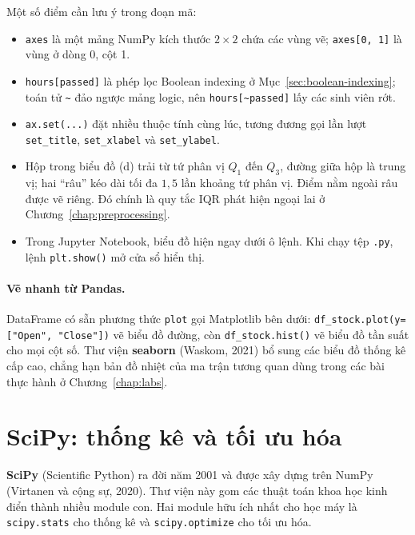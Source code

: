Một số điểm cần lưu ý trong đoạn mã:
\begin{itemize}
    \item \texttt{axes} là một mảng NumPy kích thước $2 \times 2$ chứa các vùng vẽ; \texttt{axes[0, 1]} là vùng ở dòng 0, cột 1.
    \item \texttt{hours[passed]} là phép lọc Boolean indexing ở Mục~\ref{sec:boolean-indexing}; toán tử \texttt{\textasciitilde} đảo ngược mảng logic, nên \texttt{hours[\textasciitilde passed]} lấy các sinh viên rớt.
    \item \texttt{ax.set(...)} đặt nhiều thuộc tính cùng lúc, tương đương gọi lần lượt \texttt{set\_title}, \texttt{set\_xlabel} và \texttt{set\_ylabel}.
    \item Hộp trong biểu đồ (d) trải từ tứ phân vị $Q_1$ đến $Q_3$, đường giữa hộp là trung vị; hai ``râu'' kéo dài tối đa $1{,}5$ lần khoảng tứ phân vị. Điểm nằm ngoài râu được vẽ riêng. Đó chính là quy tắc IQR phát hiện ngoại lai ở Chương~\ref{chap:preprocessing}.
    \item Trong Jupyter Notebook, biểu đồ hiện ngay dưới ô lệnh. Khi chạy tệp \texttt{.py}, lệnh \texttt{plt.show()} mở cửa sổ hiển thị.
\end{itemize}

\paragraph{Vẽ nhanh từ Pandas.} DataFrame có sẵn phương thức \texttt{plot} gọi Matplotlib bên dưới: \texttt{df\_stock.plot(y=["Open", "Close"])} vẽ biểu đồ đường, còn \texttt{df\_stock.hist()} vẽ biểu đồ tần suất cho mọi cột số. Thư viện \textbf{seaborn} (Waskom, 2021) bổ sung các biểu đồ thống kê cấp cao, chẳng hạn bản đồ nhiệt của ma trận tương quan dùng trong các bài thực hành ở Chương~\ref{chap:labs}.

\section{SciPy: thống kê và tối ưu hóa}
\label{sec:scipy}

\textbf{SciPy} (Scientific Python) ra đời năm 2001 và được xây dựng trên NumPy (Virtanen và cộng sự, 2020). Thư viện này gom các thuật toán khoa học kinh điển thành nhiều module con. Hai module hữu ích nhất cho học máy là \texttt{scipy.stats} cho thống kê và \texttt{scipy.optimize} cho tối ưu hóa.

